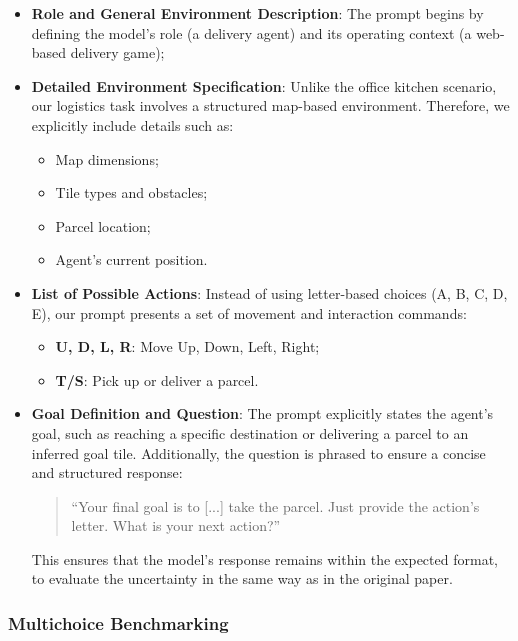 \begin{itemize}
  \item \textbf{Role and General Environment Description}: The prompt begins by defining
    the model's role (a delivery agent) and its operating context (a web-based
    delivery game);

  \item \textbf{Detailed Environment Specification}: Unlike the office kitchen scenario,
    our logistics task involves a structured map-based environment. Therefore,
    we explicitly include details such as:
    \begin{itemize}
      \item Map dimensions;

      \item Tile types and obstacles;

      \item Parcel location;

      \item Agent's current position.
    \end{itemize}

  \item \textbf{List of Possible Actions}: Instead of using letter-based choices
    (A, B, C, D, E), our prompt presents a set of movement and interaction
    commands:
    \begin{itemize}
      \item \textbf{U, D, L, R}: Move Up, Down, Left, Right;

      \item \textbf{T/S}: Pick up or deliver a parcel.
    \end{itemize}

  \item \textbf{Goal Definition and Question}: The prompt explicitly states the agent's
    goal, such as reaching a specific destination or delivering a parcel to an
    inferred goal tile. Additionally, the question is phrased to ensure a
    concise and structured response:
    \begin{quote}
      ``Your final goal is to [...] take the parcel. Just provide the action's
      letter. What is your next action?''
    \end{quote}
    This ensures that the model's response remains within the expected format,
    to evaluate the uncertainty in the same way as in the original paper.
\end{itemize}

\subsubsection{Multichoice Benchmarking}

